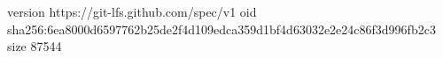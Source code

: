 version https://git-lfs.github.com/spec/v1
oid sha256:6ea8000d6597762b25de2f4d109edca359d1bf4d63032e2e24c86f3d996fb2c3
size 87544
